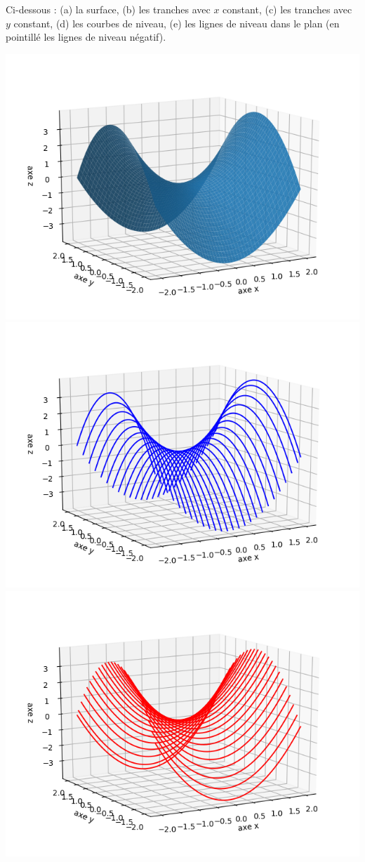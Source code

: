 \documentclass[11pt,class=report,crop=false]{standalone}
\begin{document}
\begin{exemple}
Ci-dessous : (a) la surface, (b) les tranches avec $x$ constant, (c) les tranches avec $y$ constant, (d) les courbes de niveau, (e) les lignes de niveau dans le plan (en pointillé les lignes de niveau négatif).
\begin{center}
\includegraphics[scale=\myscale,scale=0.5]{figures/fonctions-quadra-3a}
\includegraphics[scale=\myscale,scale=0.5]{figures/fonctions-quadra-3b}
\includegraphics[scale=\myscale,scale=0.5]{figures/fonctions-quadra-3c}

\end{center}
\end{exemple}
\end{document}
